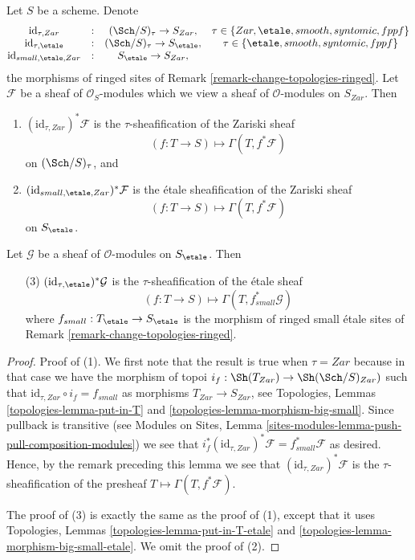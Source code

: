 \begin{lemma}
\label{lemma-compare-sites}
Let $S$ be a scheme. Denote
$$
\begin{matrix}
\text{id}_{\tau, Zar} & : & (\Sch/S)_\tau \to S_{Zar}, &
\tau \in \{Zar, \etale, smooth, syntomic, fppf\} \\
\text{id}_{\tau, \etale} & : &
(\Sch/S)_\tau \to S_\etale, &
\tau \in \{\etale, smooth, syntomic, fppf\} \\
\text{id}_{small, \etale, Zar} & : & S_\etale \to S_{Zar},
\end{matrix}
$$
the morphisms of ringed sites of
Remark \ref{remark-change-topologies-ringed}.
Let $\mathcal{F}$ be a sheaf of $\mathcal{O}_S$-modules
which we view a sheaf of $\mathcal{O}$-modules on $S_{Zar}$. Then
\begin{enumerate}
\item $(\text{id}_{\tau, Zar})^*\mathcal{F}$ is the $\tau$-sheafification
of the Zariski sheaf
$$
(f : T \to S) \longmapsto \Gamma(T, f^*\mathcal{F})
$$
on $(\Sch/S)_\tau$, and
\item $(\text{id}_{small, \etale, Zar})^*\mathcal{F}$ is the
\'etale sheafification of the Zariski sheaf
$$
(f : T \to S) \longmapsto \Gamma(T, f^*\mathcal{F})
$$
on $S_\etale$.
\end{enumerate}
Let $\mathcal{G}$ be a sheaf of $\mathcal{O}$-modules
on $S_\etale$. Then
\begin{enumerate}
\item[(3)] $(\text{id}_{\tau, \etale})^*\mathcal{G}$ is the
$\tau$-sheafification of the \'etale sheaf
$$
(f : T \to S) \longmapsto \Gamma(T, f_{small}^*\mathcal{G})
$$
where $f_{small} : T_\etale \to S_\etale$
is the morphism of ringed small \'etale sites of
Remark \ref{remark-change-topologies-ringed}.
\end{enumerate}
\end{lemma}

\begin{proof}
Proof of (1). We first note that the result is true when $\tau = Zar$
because in that case we have the morphism of topoi
$i_f : \Sh(T_{Zar}) \to \Sh(\Sch/S)_{Zar})$
such that $\text{id}_{\tau, Zar} \circ i_f = f_{small}$ as morphisms
$T_{Zar} \to S_{Zar}$, see
Topologies, Lemmas \ref{topologies-lemma-put-in-T} and
\ref{topologies-lemma-morphism-big-small}.
Since pullback is transitive (see
Modules on Sites,
Lemma \ref{sites-modules-lemma-push-pull-composition-modules})
we see that
$i_f^*(\text{id}_{\tau, Zar})^*\mathcal{F} = f_{small}^*\mathcal{F}$
as desired. Hence, by the remark preceding this lemma we see that
$(\text{id}_{\tau, Zar})^*\mathcal{F}$ is the $\tau$-sheafification of
the presheaf $T \mapsto \Gamma(T, f^*\mathcal{F})$.

\medskip\noindent
The proof of (3) is exactly the same as the proof of (1), except that it
uses
Topologies, Lemmas \ref{topologies-lemma-put-in-T-etale} and
\ref{topologies-lemma-morphism-big-small-etale}.
We omit the proof of (2).
\end{proof}

